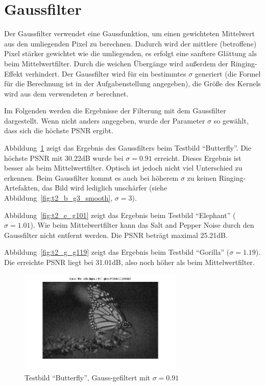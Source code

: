 \clearpage


\section{Gaussfilter}

Der Gaussfilter verwendet eine Gaussfunktion, um einen gewichteten Mittelwert aus den umliegenden Pixel zu berechnen. Dadurch wird der mittlere (betroffene) Pixel stärker gewichtet wie die umliegenden, es erfolgt eine sanftere Glättung als beim Mittelwertfilter. Durch die weichen Übergänge wird außerdem der Ringing-Effekt verhindert. Der Gaussfilter wird für ein bestimmtes $\sigma$ generiert (die Formel für die Berechnung ist in der Aufgabenstellung angegeben), die Größe des Kernels wird aus dem verwendeten $\sigma$ berechnet.

\smallskip

Im Folgenden werden die Ergebnisse der Filterung mit dem Gaussfilter dargestellt. Wenn nicht anders angegeben, wurde der Parameter $\sigma$ so gewählt, dass sich die höchste PSNR ergibt.

Abbildung~\ref{fig:t2_b_g091} zeigt das Ergebnis des Gaussfilters beim Testbild ``Butterfly''. Die höchste PSNR mit 30.22dB wurde bei $\sigma = 0.91$ erreicht. Dieses Ergebnis ist besser als beim Mittelwertfilter. Optisch ist jedoch nicht viel Unterschied zu erkennen. Beim Gaussfilter kommt es auch bei höherem $\sigma$ zu keinen Ringing-Artefakten, das Bild wird lediglich unschärfer (siehe Abbildung~\ref{fig:t2_b_g3_smooth}, $\sigma = 3$).

Abbildung~\ref{fig:t2_e_g101} zeigt das Ergebnis beim Testbild ``Elephant'' ($\sigma = 1.01$). Wie beim Mittelwertfilter kann das Salt and Pepper Noise durch den Gaussfilter nicht entfernt werden. Die PSNR beträgt maximal 25.21dB.

Abbildung~\ref{fig:t2_g_g119} zeigt das Ergebnis beim Testbild ``Gorilla'' ($\sigma = 1.19$). Die erreichte PSNR liegt bei 31.01dB, also noch höher als beim Mittelwertfilter.

\smallskip

\begin{figure}[htb]
 \centering
 \includegraphics[width=0.7\textwidth]{../images_out/t2_b_g091.png}
 \caption{Testbild ``Butterfly'', Gauss-gefiltert mit $\sigma=0.91$}
 \label{fig:t2_b_g091}
\end{figure}

